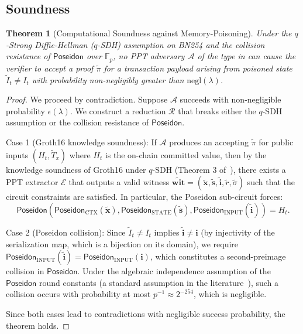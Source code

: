 \documentclass[final,5p,times,twocolumn]{elsarticle}
\theoremstyle{plain}
\newtheorem{theorem}{Theorem}[section]
\theoremstyle{definition}
\theoremstyle{remark}
\newcommand{\F}{\mathbb{F}}
\newcommand{\Adv}{\mathcal{A}}
\newcommand{\poseidon}{\textsf{Poseidon}}
\newcommand{\negl}{\mathrm{negl}}
\begin{document}
\subsection{Soundness}
\label{sec:soundness}

\begin{theorem}[Computational Soundness against Memory-Poisoning]
\label{thm:soundness}
Under the $q$-Strong Diffie-Hellman ($q$-SDH) assumption on BN254 and the
collision resistance of $\poseidon$ over $\F_p$, no PPT adversary $\Adv$ of
the type in  can cause the verifier to accept a proof
$\tilde{\pi}$ for a transaction payload arising from poisoned state
$\tilde{I}_t \neq I_t$ with probability non-negligibly greater than
$\negl(\lambda)$.
\end{theorem}

\begin{proof}
We proceed by contradiction. Suppose $\Adv$ succeeds with non-negligible
probability $\epsilon(\lambda)$. We construct a reduction $\mathcal{R}$ that
breaks either the $q$-SDH assumption or the collision resistance of $\poseidon$.

Case 1 (Groth16 knowledge soundness): If $\Adv$ produces an accepting
$\tilde{\pi}$ for public inputs $(H_t, \tilde{T}_x)$ where $H_t$ is the
on-chain committed value, then by the knowledge soundness of Groth16 under
$q$-SDH (Theorem 3 of~\cite{vcnn2024}), there exists a PPT extractor
$\mathcal{E}$ that outputs a valid witness
$\tilde{\mathbf{wit}} = (\tilde{\mathbf{x}}, \tilde{\mathbf{s}},
\tilde{\mathbf{i}}, \tilde{r}, \tilde{\sigma})$ such that the circuit
constraints are satisfied. In particular, the Poseidon sub-circuit forces:
$$\poseidon\!\left(\poseidon_{\mathrm{CTX}}(\tilde{\mathbf{x}}),
  \poseidon_{\mathrm{STATE}}(\tilde{\mathbf{s}}),
  \poseidon_{\mathrm{INPUT}}(\tilde{\mathbf{i}})\right) = H_t.$$

Case 2 (Poseidon collision): Since $\tilde{I}_t \neq I_t$ implies
$\tilde{\mathbf{i}} \neq \mathbf{i}$ (by injectivity of the serialization
map, which is a bijection on its domain), we require
$\poseidon_{\mathrm{INPUT}}(\tilde{\mathbf{i}}) = \poseidon_{\mathrm{INPUT}}(\mathbf{i})$,
which constitutes a second-preimage collision in $\poseidon$. Under the
algebraic independence assumption of the $\poseidon$ round constants (a standard
assumption in the literature~\cite{peng2025survey}), such a collision occurs
with probability at most $p^{-1} \approx 2^{-254}$, which is negligible.

Since both cases lead to contradictions with negligible success probability,
the theorem holds.
\end{proof}
\end{document}
